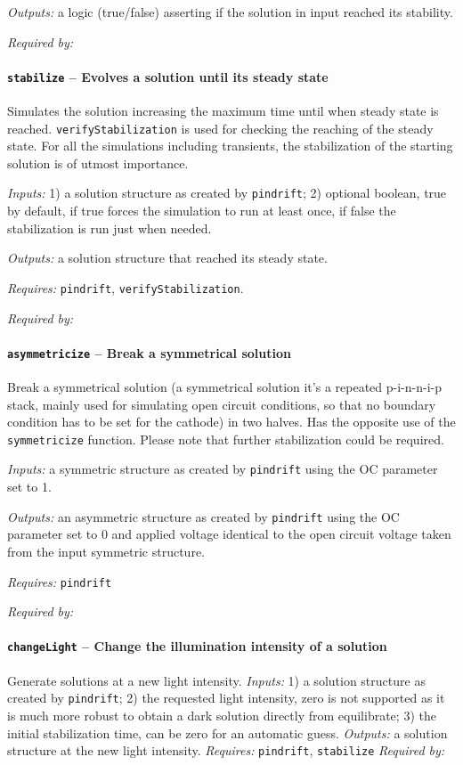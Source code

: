 \textit{Outputs:} a logic (true/false) asserting if the solution in input reached its stability.


\textit{Required by:} 

		\paragraph{\texttt{stabilize} -- Evolves a solution until its steady state}
Simulates the solution increasing the maximum time until when steady state is reached. 
\texttt{verify\-Stabilization} is used for checking the reaching of the steady state.
For all the simulations including transients, the stabilization of the starting solution is of utmost importance.

\textit{Inputs:} 1) a solution structure as created by \texttt{pindrift};
   2) optional boolean, true by default, 
     if true forces the simulation to run at least once, if false the
     stabilization is run just when needed.
     
\textit{Outputs:} a solution structure that reached its steady state.

\textit{Requires:} \texttt{pindrift}, \texttt{verify\-Stabilization}.

\textit{Required by:} 

		\paragraph{\texttt{asymmetricize} -- Break a symmetrical solution}\label{asymmetricize}
		Break a symmetrical solution (a symmetrical solution it's a repeated p-i-n-n-i-p stack, mainly used for simulating open circuit conditions, so that no boundary condition has to be set for the cathode) in two halves. Has the opposite use of the \texttt{symmetricize} function.
		Please note that further stabilization could be required.
		
		\textit{Inputs:} a symmetric structure as created by \texttt{pindrift} using the OC parameter set to 1.
		
		\textit{Outputs:} an asymmetric structure as created by \texttt{pindrift} using the OC
		     parameter set to 0 and applied voltage identical to the open circuit
		     voltage taken from the input symmetric structure.
		     
	\textit{Requires:} \texttt{pindrift}
	
	\textit{Required by:} 

		\paragraph{\texttt{change\-Light} -- Change the illumination intensity of a solution}
		Generate solutions at a new light intensity.
		\textit{Inputs:} 1) a solution structure as created by \texttt{pindrift};
		2) the requested light intensity, zero is not supported as it is
		    much more robust to obtain a dark solution directly from equilibrate;
		3) the initial stabilization time, can be zero for an automatic
		     guess.
		\textit{Outputs:} a solution structure at the new light intensity.
		\textit{Requires:} \texttt{pindrift}, \texttt{stabilize}
			\textit{Required by:} 
			
